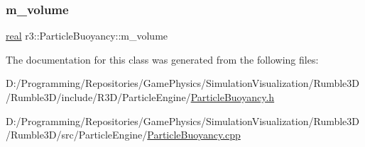 \mbox{\label{classr3_1_1_particle_buoyancy_ade7d34f053371dadc2113563760599c9}} 
\subsubsection{\texorpdfstring{m\+\_\+volume}{m\_volume}}
{\footnotesize\ttfamily \mbox{\hyperlink{namespacer3_ab2016b3e3f743fb735afce242f0dc1eb}{real}} r3\+::\+Particle\+Buoyancy\+::m\+\_\+volume\hspace{0.3cm}{\ttfamily [protected]}}



The documentation for this class was generated from the following files\+:\begin{DoxyCompactItemize}
\item 
D\+:/\+Programming/\+Repositories/\+Game\+Physics/\+Simulation\+Visualization/\+Rumble3\+D/\+Rumble3\+D/include/\+R3\+D/\+Particle\+Engine/\mbox{\hyperlink{_particle_buoyancy_8h}{Particle\+Buoyancy.\+h}}\item 
D\+:/\+Programming/\+Repositories/\+Game\+Physics/\+Simulation\+Visualization/\+Rumble3\+D/\+Rumble3\+D/src/\+Particle\+Engine/\mbox{\hyperlink{_particle_buoyancy_8cpp}{Particle\+Buoyancy.\+cpp}}\end{DoxyCompactItemize}
